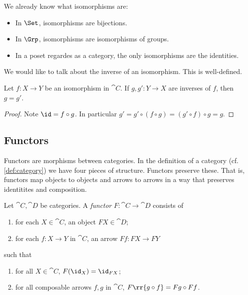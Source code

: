 \documentclass{article}
\begin{document}
\begin{example}
  We already know what isomorphisms are:
  \begin{itemize}
    \item In $\Set$, isomorphisms are bijections.
    \item In $\Grp$, isomorphisms are isomorphisms of groups.
    \item In a poset regardes as a category, the only isomorphisms are the
      identities.
  \end{itemize}
\end{example}

We would like to talk about the inverse of an isomorphism. This is well-defined.

\begin{proposition}\label{prop:inverses_are_unique}
  Let $f:X\to Y$ be an isomorphism in $\cat{C}$. If $g,g':Y\to X$ are inverses of
  $f$, then $g=g'$.
  \begin{proof}
    Note $\id=f\circ g$. In particular $g'=g'\circ(f\circ g) = (g'\circ f)\circ g=g$.
  \end{proof}
\end{proposition}

\subsection{Functors}

Functors are morphisms between categories. In the definition of a category (cf.
\ref{def:category}) we have four pieces of structure. Functors preserve these.
That is, functors map objects to objects and arrows to arrows in a way that
preserves identitites and composition.

\begin{definition}\label{def:functor}
  Let $\cat{C},\cat{D}$ be categories. A \emph{functor} $F:\cat{C}\to\cat{D}$
  consists of
  \begin{enumerate}
    \item for each $X\in\cat{C}$, an object $FX\in\cat{D}$;
    \item for each $f:X\to Y$ in $\cat{C}$, an arrow $Ff:FX\to FY$
  \end{enumerate}
  such that
  \begin{enumerate}
    \item for all $X\in\cat{C}$, $F(\id_X)=\id_{FX}$;
    \item for all composable arrows $f,g$ in $\cat{C}$, $F\rr{g\circ f}=Fg\circ Ff$.
  \end{enumerate}
\end{definition}
\end{document}

